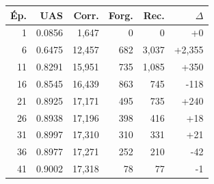 \begin{table}[ht]
\hfill
\begin{minipage}[t]{0.42\linewidth}
\centering\tiny
\begin{tabular}{rrrrrr}
\toprule
\textbf{Ép.} & \textbf{UAS} & \textbf{Corr.} & \textbf{Forg.} & \textbf{Rec.} & \textbf{$\Delta$} \\
\midrule
1 & 0.0856 & 1,647 & 0 & 0 & +0 \\
6 & 0.6475 & 12,457 & 682 & 3,037 & +2,355 \\
11 & 0.8291 & 15,951 & 735 & 1,085 & +350 \\
16 & 0.8545 & 16,439 & 863 & 745 & -118 \\
21 & 0.8925 & 17,171 & 495 & 735 & +240 \\
26 & 0.8938 & 17,196 & 398 & 416 & +18 \\
31 & 0.8997 & 17,310 & 310 & 331 & +21 \\
36 & 0.8977 & 17,271 & 252 & 210 & -42 \\
41 & 0.9002 & 17,318 & 78 & 77 & -1 \\
\bottomrule
\end{tabular}
\end{minipage}
\end{table}
